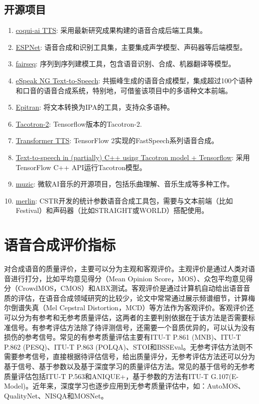 \documentclass[cn,10pt,math=newtx,citestyle=gb7714-2015,bibstyle=gb7714-2015]{elegantbook}
\begin{document}
\subsection{开源项目}
\begin{enumerate}
  \item \href{https://github.com/coqui-ai/TTS}{coqui-ai TTS}: 采用最新研究成果构建的语音合成后端工具集。
  \item \href{https://github.com/espnet/espnet}{ESPNet}: 语音合成和识别工具集，主要集成声学模型、声码器等后端模型。
  \item \href{https://github.com/pytorch/fairseq}{fairseq}: 序列到序列建模工具，包含语音识别、合成、机器翻译等模型。
  \item \href{https://github.com/espeak-ng/espeak-ng}{eSpeak NG Text-to-Speech}: 共振峰生成的语音合成模型，集成超过100个语种和口音的语音合成系统，特别地，可借鉴该项目中的多语种文本前端。
  \item \href{https://github.com/dmort27/epitran}{Epitran}: 将文本转换为IPA的工具，支持众多语种。
  \item \href{https://github.com/Rayhane-mamah/Tacotron-2}{Tacotron-2}: Tensorflow版本的Tacotron-2.
  \item \href{https://github.com/as-ideas/TransformerTTS}{Transformer TTS}: TensorFlow 2实现的FastSpeech系列语音合成。
  \item \href{https://github.com/syoyo/tacotron-tts-cpp}{Text-to-speech in (partially) C++ using Tacotron model + Tensorflow}: 采用TensorFlow C++ API运行Tacotron模型。
  \item \href{https://github.com/microsoft/muzic}{muzic}: 微软AI音乐的开源项目，包括乐曲理解、音乐生成等多种工作。
  \item \href{https://github.com/CSTR-Edinburgh/merlin}{merlin}: CSTR开发的统计参数语音合成工具包，需要与文本前端（比如Festival）和声码器（比如STRAIGHT或WORLD）搭配使用。
\end{enumerate}

\section{语音合成评价指标}
对合成语音的质量评价，主要可以分为主观和客观评价。主观评价是通过人类对语音进行打分，比如平均意见得分（Mean Opinion Score，MOS）、众包平均意见得分（CrowdMOS，CMOS）和ABX测试。客观评价是通过计算机自动给出语音音质的评估，在语音合成领域研究的比较少，论文中常常通过展示频谱细节，计算梅尔倒谱失真（Mel Cepstral Distortion，MCD）等方法作为客观评价。客观评价还可以分为有参考和无参考质量评估，这两者的主要判别依据在于该方法是否需要标准信号。有参考评估方法除了待评测信号，还需要一个音质优异的，可以认为没有损伤的参考信号。常见的有参考质量评估主要有ITU-T P.861 (MNB)、ITU-T P.862 (PESQ)、ITU-T P.863 (POLQA)、STOI和BSSEval。无参考评估方法则不需要参考信号，直接根据待评估信号，给出质量评分，无参考评估方法还可以分为基于信号、基于参数以及基于深度学习的质量评估方法。常见的基于信号的无参考质量评估包括ITU-T P.563和ANIQUE+，基于参数的方法有ITU-T G.107(E-Model)。近年来，深度学习也逐步应用到无参考质量评估中，如：AutoMOS、QualityNet、NISQA和MOSNet。
\end{document}
